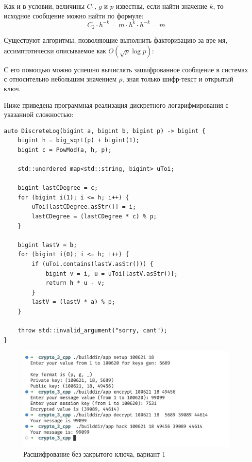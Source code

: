 \documentclass[a4paper]{article}
\begin{document}
  Как и в условии, величины $C_1$, $g$ и $p$ известны, если найти значение $k$,
  то исходное сообщение можно найти по формуле:
  \begin{equation}
    C_2 \cdot h^{-k} = m\cdot h^k \cdot h^{-k} = m
  \end{equation}

  Существуют алгоритмы, позволяющие выполнить факторизацию за вре-мя, ассимптотически описываемое как $O(\sqrt{p}\log{p})$:

  С его помощью можно успешно вычислять зашифрованное сообщение в системах с относительно небольшим значением $p$, зная только шифр-текст и открытый ключ.
  
  \newpage
  Ниже приведена программная реализация дискретного логарифмирования с указанной сложностью:
  \begin{verbatim}
auto DiscreteLog(bigint a, bigint b, bigint p) -> bigint {
    bigint h = big_sqrt(p) + bigint(1);
    bigint c = PowMod(a, h, p);

    std::unordered_map<std::string, bigint> uToi;

    bigint lastCDegree = c;
    for (bigint i(1); i <= h; i++) {
        uToi[lastCDegree.asStr()] = i;
        lastCDegree = (lastCDegree * c) % p;
    }

    bigint lastV = b;
    for (bigint i(0); i <= h; i++) {
        if (uToi.contains(lastV.asStr())) {
            bigint v = i, u = uToi[lastV.asStr()];
            return h * u - v;
        }
        lastV = (lastV * a) % p;
    }

    throw std::invalid_argument("sorry, cant");
}
  \end{verbatim}

  \begin{figure}[H]
    \centering
    \includegraphics[width=\textwidth]{15_4}
    \caption{Расшифрование без закрытого ключа, вариант 1}
  \end{figure}
\end{document}
